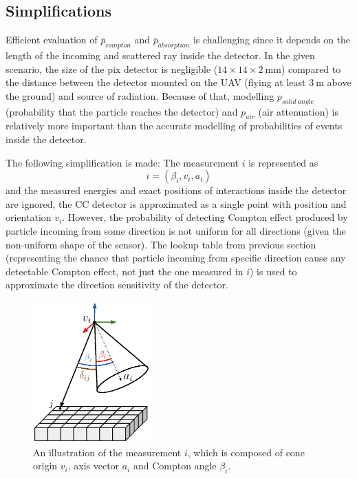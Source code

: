 \subsection{Simplifications}
Efficient evaluation of $\bar{p}_{compton}$ and $\bar{p}_{absorption}$ is challenging since it depends on the length of the incoming and scattered ray inside the detector.
In the given scenario, the size of the \ac{pix} detector is negligible ($14 \times 14 \times 2 \ \mathrm{mm}$) compared to the distance between the detector mounted on the \ac{UAV} (flying at least $\SI{3}\meter$ above the ground) and source of radiation.
Because of that, modelling $p_{solid\ angle}$ (probability that the particle reaches the detector) and $p_{air}$ (air attenuation) is relatively more important than the accurate modelling of probabilities of events inside the detector.

The following simplification is made:
The measurement $i$ is represented as
\begin{equation}
  i = (\beta_{i}, v_{i}, a_{i})
\end{equation}
and the measured energies and exact positions of interactions inside the detector are ignored,
the \ac{CC} detector is approximated as a single point with position and orientation $v_{i}$.
However, the probability of detecting Compton effect produced by particle incoming from some direction is not uniform for all directions (given the non-uniform shape of the sensor).
The lookup table from previous section (representing the chance that particle incoming from specific direction cause any detectable Compton effect, not just the one measured in $i$) is used to approximate the direction sensitivity of the detector.

\begin{figure}[!h]
  \centering
    \includegraphics[width=0.4\textwidth]{./fig/photos/system_comp.eps}
    \caption{An illustration of the measurement $i$, which is composed of cone origin $v_{i}$, axis vector $a_{i}$ and Compton angle $\beta_{i}$.}
    \label{fig:system_comp}
\end{figure}

